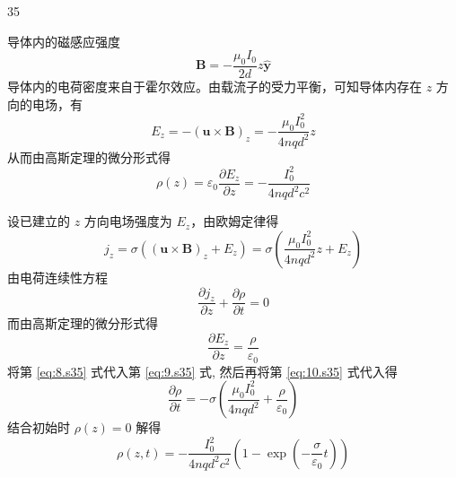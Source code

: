 \begin{solution}{35}
\begin{subsolution}
        导体内的磁感应强度
        \begin{equation}
            \pmb {B} = - \frac {\mu_ {0} I _ {0}}{2 d} z \hat {\pmb {y}}
            \label{eq:5.s35}
        \end{equation}
        导体内的电荷密度来自于霍尔效应。由载流子的受力平衡，可知导体内存在 $z$ 方向的电场，有
        \begin{equation}
            E _ {z} = - (\pmb {u} \times \pmb {B}) _ {z} = - \frac {\mu_ {0} I _ {0} ^ {2}}{4 n q d ^ {2}} z
            \label{eq:6.s35}
        \end{equation}
        从而由高斯定理的微分形式得
        \begin{equation}
            \rho (z) = \varepsilon_ {0} \frac {\partial E _ {z}}{\partial z} = - \frac {I _ {0} ^ {2}}{4 n q d ^ {2} c ^ {2}}
            \label{eq:7.s35}
        \end{equation}
    \end{subsolution}
    \begin{subsolution}
        设已建立的 $z$ 方向电场强度为 $E_{z}$，由欧姆定律得
        \begin{equation}
            j _ {z} = \sigma ((\boldsymbol {u} \times \boldsymbol {B}) _ {z} + E _ {z}) = \sigma \left(\frac {\mu_ {0} I _ {0} ^ {2}}{4 n q d ^ {2}} z + E _ {z}\right)
            \label{eq:8.s35}
        \end{equation}
        由电荷连续性方程
        \begin{equation}
            \frac {\partial j _ {z}}{\partial z} + \frac {\partial \rho}{\partial t} = 0
            \label{eq:9.s35}
        \end{equation}
        而由高斯定理的微分形式得
        \begin{equation}
            \frac {\partial E _ {z}}{\partial z} = \frac {\rho}{\varepsilon_ {0}}
            \label{eq:10.s35}
        \end{equation}
        将第 \eqref{eq:8.s35} 式代入第 \eqref{eq:9.s35} 式, 然后再将第 \eqref{eq:10.s35} 式代入得
        \begin{equation}
            \frac {\partial \rho}{\partial t} = - \sigma \left(\frac {\mu_ {0} I _ {0} ^ {2}}{4 n q d ^ {2}} + \frac {\rho}{\varepsilon_ {0}}\right)
            \label{eq:11.s35}
        \end{equation}
        结合初始时 $\rho (z) = 0$ 解得
        \begin{equation}
            \rho (z, t) = - \frac {I _ {0} ^ {2}}{4 n q d ^ {2} c ^ {2}} \left(1 - \exp \left(- \frac {\sigma}{\varepsilon_ {0}} t\right)\right)

\end{equation}
\end{subsolution}
\end{solution}
